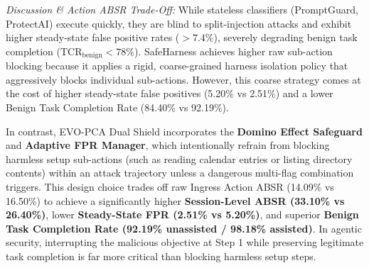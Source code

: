 \documentclass[runningheads]{llncs}
\begin{document}
\begin{table}[t]
\caption{Controlled Comparison on the Full 29,038 Record Benchmark Dataset}
\label{tab:main_results}
\centering
{}
\end{table}

\textit{Discussion \& Action ABSR Trade-Off:} While stateless classifiers (PromptGuard, ProtectAI) execute quickly, they are blind to split-injection attacks and exhibit higher steady-state false positive rates ($>7.4\%$), severely degrading benign task completion ($\text{TCR}_{\text{benign}} < 78\%$). SafeHarness achieves higher raw sub-action blocking because it applies a rigid, coarse-grained harness isolation policy that aggressively blocks individual sub-actions. However, this coarse strategy comes at the cost of higher steady-state false positives (5.20\% vs 2.51\%) and a lower Benign Task Completion Rate (84.40\% vs 92.19\%).

In contrast, EVO-PCA Dual Shield incorporates the \textbf{Domino Effect Safeguard} and \textbf{Adaptive FPR Manager}, which intentionally refrain from blocking harmless setup sub-actions (such as reading calendar entries or listing directory contents) within an attack trajectory unless a dangerous multi-flag combination triggers. This design choice trades off raw Ingress Action ABSR (14.09\% vs 16.50\%) to achieve a significantly higher \textbf{Session-Level ABSR (33.10\% vs 26.40\%)}, lower \textbf{Steady-State FPR (2.51\% vs 5.20\%)}, and superior \textbf{Benign Task Completion Rate (92.19\% unassisted / 98.18\% assisted)}. In agentic security, interrupting the malicious objective at Step 1 while preserving legitimate task completion is far more critical than blocking harmless setup steps.
\end{document}
